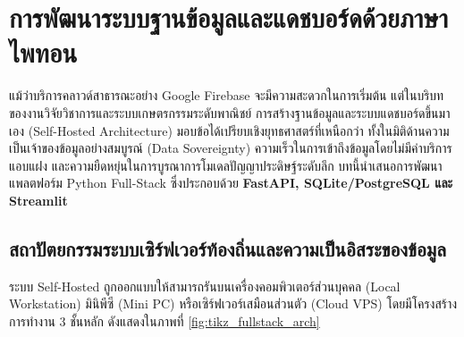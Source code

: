\chapter{การพัฒนาระบบฐานข้อมูลและแดชบอร์ดด้วยภาษาไพทอน}
\label{chap:dashboard}

แม้ว่าบริการคลาวด์สาธารณะอย่าง Google Firebase จะมีความสะดวกในการเริ่มต้น แต่ในบริบทของงานวิจัยวิชาการและระบบเกษตรกรรมระดับพาณิชย์ การสร้างฐานข้อมูลและระบบแดชบอร์ดขึ้นมาเอง (Self-Hosted Architecture) มอบข้อได้เปรียบเชิงยุทธศาสตร์ที่เหนือกว่า ทั้งในมิติด้านความเป็นเจ้าของข้อมูลอย่างสมบูรณ์ (Data Sovereignty) ความเร็วในการเข้าถึงข้อมูลโดยไม่มีค่าบริการแอบแฝง และความยืดหยุ่นในการบูรณาการโมเดลปัญญาประดิษฐ์ระดับลึก บทนี้นำเสนอการพัฒนาแพลตฟอร์ม Python Full-Stack ซึ่งประกอบด้วย \textbf{FastAPI, SQLite/PostgreSQL และ Streamlit}

\section{สถาปัตยกรรมระบบเซิร์ฟเวอร์ท้องถิ่นและความเป็นอิสระของข้อมูล}

ระบบ Self-Hosted ถูกออกแบบให้สามารถรันบนเครื่องคอมพิวเตอร์ส่วนบุคคล (Local Workstation) มินิพีซี (Mini PC) หรือเซิร์ฟเวอร์เสมือนส่วนตัว (Cloud VPS) โดยมีโครงสร้างการทำงาน 3 ชั้นหลัก ดังแสดงในภาพที่ \ref{fig:tikz_fullstack_arch}


